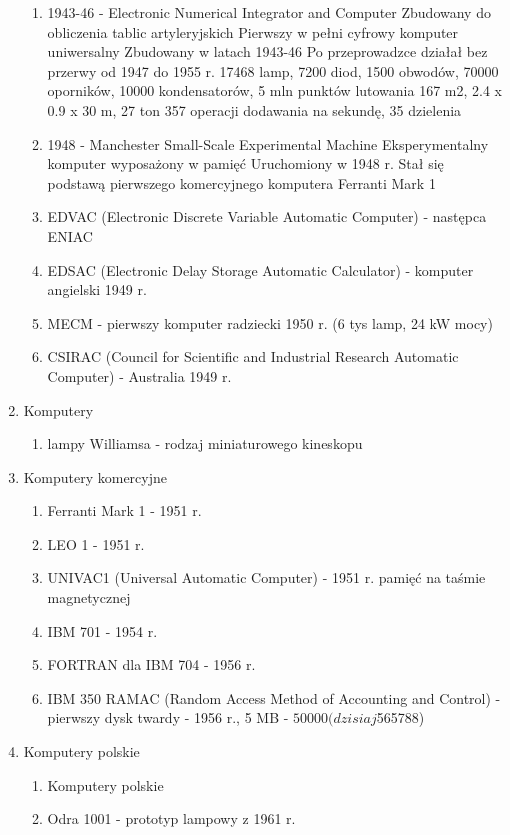 \documentclass[a4paper,twoside,onecolumn]{report}
\begin{document}
\begin{enumerate}[-]
\begin{enumerate}[*]
					\item 1943-46 - Electronic Numerical Integrator and Computer Zbudowany do obliczenia tablic artyleryjskich Pierwszy w pełni cyfrowy komputer uniwersalny
						Zbudowany w latach 1943-46 Po przeprowadzce działał bez przerwy od 1947 do 1955 r. 17468 lamp, 7200 diod, 1500 obwodów, 70000 oporników, 								10000 kondensatorów, 5 mln punktów lutowania 167 m2, 2.4 x 0.9 x 30 m, 27 ton 357 operacji dodawania na sekundę, 35 dzielenia
					\item 1948 - Manchester Small-Scale Experimental Machine Eksperymentalny komputer wyposażony w pamięć Uruchomiony w 1948 r. Stał się podstawą 								pierwszego komercyjnego komputera Ferranti Mark 1
					\item EDVAC (Electronic Discrete Variable Automatic Computer) - następca ENIAC
					\item EDSAC (Electronic Delay Storage Automatic Calculator) - komputer angielski 1949 r.
					\item MECM - pierwszy komputer radziecki 1950 r. (6 tys lamp, 24 kW mocy)
					\item CSIRAC (Council for Scientific and Industrial Research Automatic Computer) - Australia 1949 r.
				\end{enumerate}
			\item Komputery
				\begin{enumerate}[*]
					\item lampy Williamsa - rodzaj miniaturowego kineskopu
				\end{enumerate}
			\item Komputery komercyjne
				\begin{enumerate}[*]
					\item Ferranti Mark 1 - 1951 r.
					\item LEO 1 - 1951 r.
					\item UNIVAC1 (Universal Automatic Computer) - 1951 r. pamięć na taśmie magnetycznej
					\item IBM 701 - 1954 r.
					\item FORTRAN dla IBM 704 - 1956 r.
					\item IBM 350 RAMAC (Random Access Method of Accounting and Control) - pierwszy dysk twardy - 1956 r., 5 MB - $50000 (dzisiaj $565788)
				\end{enumerate}
			\item Komputery polskie
				\begin{enumerate}[*]
					\item Komputery polskie
					\item Odra 1001 - prototyp lampowy z 1961 r.

\end{enumerate}
\end{enumerate}
\end{document}

